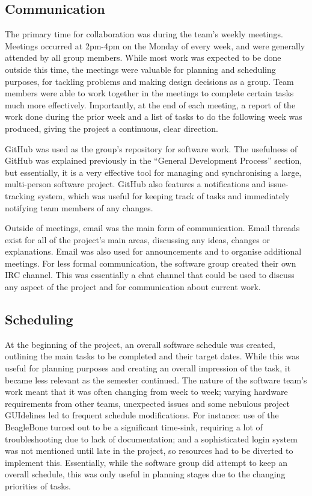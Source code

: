 \subsection{Communication} \label{Communication}
The primary time for collaboration was during the team's weekly meetings. Meetings occurred at 2pm-4pm on the Monday of every week, and were generally attended by all group members. While most work was expected to be done outside this time, the meetings were valuable for planning and scheduling purposes, for tackling problems and making design decisions as a group. Team members were able to work together in the meetings to complete certain tasks much more effectively. Importantly, at the end of each meeting, a report of the work done during the prior week and a list of tasks to do the following week was produced, giving the project a continuous, clear direction. 

GitHub was used as the group's repository for software work. The usefulness of GitHub was explained previously in the ``General Development Process'' section, but essentially, it is a very effective tool for managing and synchronising a large, multi-person software project. GitHub also features a notifications and issue-tracking system, which was useful for keeping track of tasks and immediately notifying team members of any changes.


Outside of meetings, email was the main form of communication. Email threads exist for all of the project's main areas, discussing any ideas, changes or explanations. Email was also used for announcements and to organise additional meetings. For less formal communication, the software group created their own IRC channel. This was essentially a chat channel that could be used to discuss any aspect of the project and for communication about current work.

\subsection{Scheduling}

At the beginning of the project, an overall software schedule was created, outlining the main tasks to be completed and their target dates. While this was useful for planning purposes and creating an overall impression of the task, it became less relevant as the semester continued. The nature of the software team's work meant that it was often changing from week to week; varying hardware requirements from other teams, unexpected issues and some nebulous project GUIdelines led to frequent schedule modifications. For instance: use of the BeagleBone turned out to be a significant time-sink, requiring a lot of troubleshooting due to lack of documentation; and a sophisticated login system was not mentioned until late in the project, so resources had to be diverted to implement this. Essentially, while the software group did attempt to keep an overall schedule, this was only useful in planning stages due to the changing priorities of tasks.


